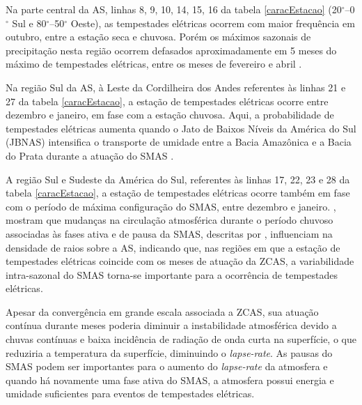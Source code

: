 Na parte central da AS, linhas  8, 9, 10, 14, 15, 16 da tabela \ref{caracEstacao} (20$^{\circ}$--0$^{\circ}$ Sul e 80$^{\circ}$--50$^{\circ}$ Oeste), as tempestades elétricas ocorrem com maior frequência em outubro, entre a estação seca e chuvosa. Porém os máximos sazonais de precipitação nesta região ocorrem defasados aproximadamente em 5 meses do máximo de tempestades elétricas, entre os meses de fevereiro e abril \cite{grimm2003nino,reboita2010regimes,shi-atlas,bombardi2008variabilidade,cusdodioTese}.


Na região Sul da AS, à Leste da Cordilheira dos Andes referentes às linhas  21 e 27 da tabela \ref{caracEstacao}, a estação de tempestades elétricas ocorre entre dezembro e janeiro, em fase com a estação chuvosa. Aqui, a probabilidade de tempestades elétricas aumenta quando o Jato de Baixos Níveis da América do Sul (JBNAS) intensifica o transporte de umidade entre a Bacia Amazônica e a Bacia do Prata durante a atuação do SMAS \cite{marengo2004}.   

A região Sul e Sudeste da América do Sul, referentes às linhas 17, 22, 23 e 28 da tabela \ref{caracEstacao}, a estação de tempestades elétricas ocorre também em fase com o período de máxima configuração do SMAS, entre dezembro e janeiro. , mostram que mudanças na circulação atmosférica durante o período chuvoso associadas às fases ativa e de pausa da SMAS, descritas por  , influenciam na densidade de raios sobre a AS,  indicando que, nas regiões em que a estação de tempestades elétricas coincide com os meses de  atuação da ZCAS, a variabilidade intra-sazonal do SMAS torna-se importante para a ocorrência de tempestades elétricas.

Apesar da convergência em grande escala associada a ZCAS, sua atuação contínua durante meses poderia diminuir a instabilidade atmosférica devido a chuvas contínuas e baixa incidência de radiação de onda curta na superfície, o que reduziria a temperatura da superfície, diminuindo o \textit{lapse-rate}. As pausas do SMAS podem ser importantes para o aumento do \textit{lapse-rate} da atmosfera e quando há novamente uma fase ativa do SMAS, a atmosfera possui energia e umidade suficientes para eventos de tempestades elétricas.


